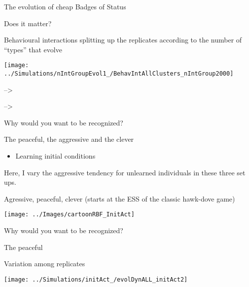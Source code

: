 \documentclass[
  ignorenonframetext,
]{beamer}
\providecommand{\tightlist}{%
  \setlength{\itemsep}{0pt}\setlength{\parskip}{0pt}}
\begin{document}
\begin{frame}{The evolution of cheap Badges of Status}
\protect\hypertarget{the-evolution-of-cheap-badges-of-status-3}{}

\begin{block}{Does it matter?}

\small

Behavioural interactions splitting up the replicates according to the
number of ``types'' that evolve

\begin{flushleft}\texttt{[image: ../Simulations/nIntGroupEvol1\_/BehavIntAllClusters\_nIntGroup2000]} \end{flushleft}

--\textgreater{}

--\textgreater{}

\end{block}

\end{frame}

\begin{frame}{Why would you want to be recognized?}
\protect\hypertarget{why-would-you-want-to-be-recognized}{}

\pause

\begin{block}{The peaceful, the aggressive and the clever}

\begin{itemize}
\tightlist
\item
  Learning initial conditions
\end{itemize}

\tiny

Here, I vary the aggressive tendency for unlearned individuals in these
three set ups.

Agressive, peaceful, clever (starts at the ESS of the classic hawk-dove
game)

\begin{flushleft}\texttt{[image: ../Images/cartoonRBF\_InitAct]} \end{flushleft}

\end{block}

\end{frame}

\begin{frame}{Why would you want to be recognized?}
\protect\hypertarget{why-would-you-want-to-be-recognized-1}{}

\begin{block}{The peaceful}

Variation among replicates

\begin{flushleft}\texttt{[image: ../Simulations/initAct\_/evolDynALL\_initAct2]} \end{flushleft}

\end{block}

\end{frame}
\end{document}
